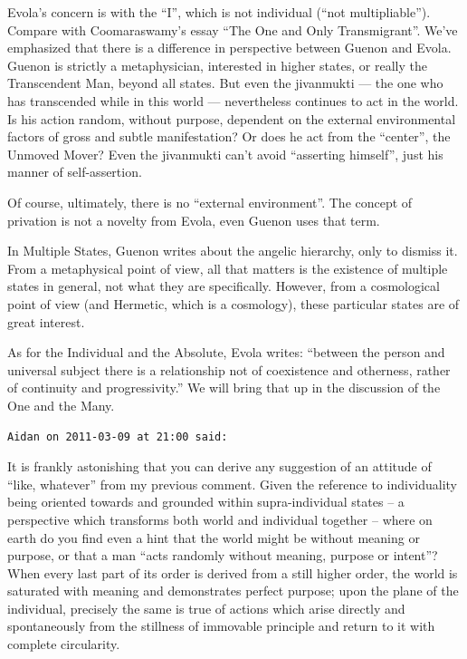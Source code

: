 \begin{footnotesize}
\begin{sffamily}
Evola's concern is with the ``I'', which is not individual (``not multipliable''). Compare with Coomaraswamy's essay ``The One and Only Transmigrant''. We've emphasized that there is a difference in perspective between Guenon and Evola. Guenon is strictly a metaphysician, interested in higher states, or really the Transcendent Man, beyond all states. But even the jivanmukti --- the one who has transcended while in this world --- nevertheless continues to act in the world. Is his action random, without purpose, dependent on the external environmental factors of gross and subtle manifestation? Or does he act from the ``center'', the Unmoved Mover? Even the jivanmukti can't avoid ``asserting himself'', just his manner of self-assertion.

Of course, ultimately, there is no ``external environment''. The concept of privation is not a novelty from Evola, even Guenon uses that term.

In Multiple States, Guenon writes about the angelic hierarchy, only to dismiss it. From a metaphysical point of view, all that matters is the existence of multiple states in general, not what they are specifically. However, from a cosmological point of view (and Hermetic, which is a cosmology), these particular states are of great interest.

As for the Individual and the Absolute, Evola writes: ``between the person and universal subject there is a relationship not of coexistence and otherness, rather of continuity and progressivity.'' We will bring that up in the discussion of the One and the Many.

\hfill

\texttt{Aidan on 2011-03-09 at 21:00 said:}

It is frankly astonishing that you can derive any suggestion of an attitude of ``like, whatever'' from my previous comment. Given the reference to individuality being oriented towards and grounded within supra-individual states -- a perspective which transforms both world and individual together -- where on earth do you find even a hint that the world might be without meaning or purpose, or that a man ``acts randomly without meaning, purpose or intent''? When every last part of its order is derived from a still higher order, the world is saturated with meaning and demonstrates perfect purpose; upon the plane of the individual, precisely the same is true of actions which arise directly and spontaneously from the stillness of immovable principle and return to it with complete circularity.


\end{sffamily}
\end{footnotesize}
